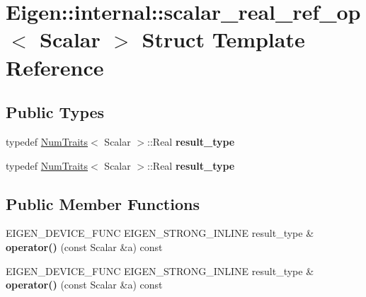 \hypertarget{struct_eigen_1_1internal_1_1scalar__real__ref__op}{}\section{Eigen\+:\+:internal\+:\+:scalar\+\_\+real\+\_\+ref\+\_\+op$<$ Scalar $>$ Struct Template Reference}
\label{struct_eigen_1_1internal_1_1scalar__real__ref__op}
\subsection*{Public Types}
\begin{DoxyCompactItemize}
\item 
\mbox{\label{struct_eigen_1_1internal_1_1scalar__real__ref__op_af8a46398acb2b10bf00fc8271bc11a99}} 
typedef \hyperlink{group___core___module_struct_eigen_1_1_num_traits}{Num\+Traits}$<$ Scalar $>$\+::Real {\bfseries result\+\_\+type}
\item 
\mbox{\label{struct_eigen_1_1internal_1_1scalar__real__ref__op_af8a46398acb2b10bf00fc8271bc11a99}} 
typedef \hyperlink{group___core___module_struct_eigen_1_1_num_traits}{Num\+Traits}$<$ Scalar $>$\+::Real {\bfseries result\+\_\+type}
\end{DoxyCompactItemize}
\subsection*{Public Member Functions}
\begin{DoxyCompactItemize}
\item 
\mbox{\label{struct_eigen_1_1internal_1_1scalar__real__ref__op_ac0d636aef5893c9eab424fccbbbc1d6e}} 
E\+I\+G\+E\+N\+\_\+\+D\+E\+V\+I\+C\+E\+\_\+\+F\+U\+NC E\+I\+G\+E\+N\+\_\+\+S\+T\+R\+O\+N\+G\+\_\+\+I\+N\+L\+I\+NE result\+\_\+type \& {\bfseries operator()} (const Scalar \&a) const
\item 
\mbox{\label{struct_eigen_1_1internal_1_1scalar__real__ref__op_ac0d636aef5893c9eab424fccbbbc1d6e}} 
E\+I\+G\+E\+N\+\_\+\+D\+E\+V\+I\+C\+E\+\_\+\+F\+U\+NC E\+I\+G\+E\+N\+\_\+\+S\+T\+R\+O\+N\+G\+\_\+\+I\+N\+L\+I\+NE result\+\_\+type \& {\bfseries operator()} (const Scalar \&a) const
\end{DoxyCompactItemize}



